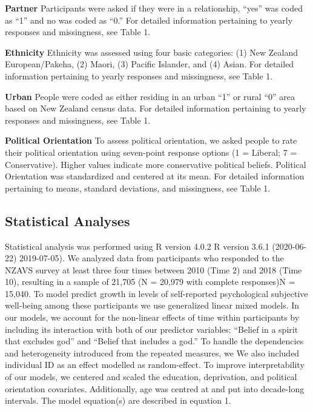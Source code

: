 \documentclass[
  english,
  man]{apa6}
\begin{document}
\textbf{Partner} Participants were asked if they were in a relationship, \enquote{yes} was coded as \enquote{1} and no was coded as \enquote{0.} For detailed information pertaining to yearly responses and missingness, see Table 1.

\textbf{Ethnicity} Ethnicity was assessed using four basic categories: (1) New Zealand European/Pakeha, (2) Maori, (3) Pacific Islander, and (4) Asian. For detailed information pertaining to yearly responses and missingness, see Table 1.

\textbf{Urban} People were coded as either residing in an urban \enquote{1} or rural \enquote{0} area based on New Zealand census data. For detailed information pertaining to yearly responses and missingness, see Table 1.

\textbf{Political Orientation} To assess political orientation, we asked people to rate their political orientation using seven-point response options (1 = Liberal; 7 = Conservative). Higher values indicate more conservative political beliefs. Political Orientation was standardized and centered at its mean. For detailed information pertaining to means, standard deviations, and missingness, see Table 1.

\hypertarget{statistical-analyses}{%
\subsection{Statistical Analyses}\label{statistical-analyses}}

Statistical analysis was performed using R version 4.0.2 R version 3.6.1 (2020-06-22) 2019-07-05). We analyzed data from participants who responded to the NZAVS survey at least three four times between 2010 (Time 2) and 2018 (Time 10), resulting in a sample of 21,705 (N = 20,979 with complete responses)N = 15,040. To model predict growth in levels of self-reported psychological subjective well-being among these participants we use generalized linear mixed models. In our models, we account for the non-linear effects of time within participants by including its interaction with both of our predictor variables: \enquote{Belief in a spirit that excludes god} and \enquote{Belief that includes a god.} To handle the dependencies and heterogeneity introduced from the repeated measures, we We also included individual ID as an effect modelled as random-effect. To improve interpretability of our models, we centered and scaled the education, deprivation, and political orientation covariates. Additionally, age was centred at and put into decade-long intervals.
The model equation(s) are described in equation 1.
\end{document}
